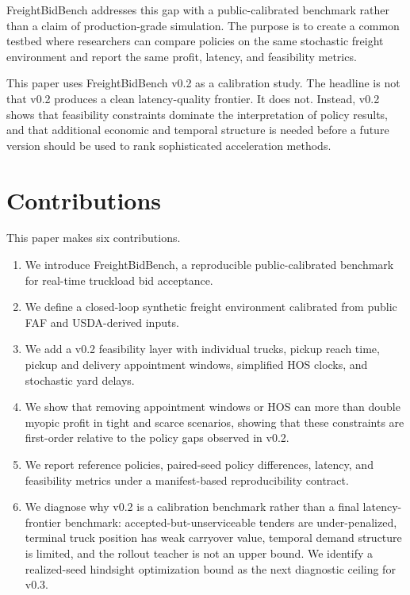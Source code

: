 \documentclass[11pt]{article}
\begin{document}
FreightBidBench addresses this gap with a public-calibrated benchmark rather
than a claim of production-grade simulation. The purpose is to create a common
testbed where researchers can compare policies on the same stochastic freight
environment and report the same profit, latency, and feasibility metrics.

This paper uses FreightBidBench v0.2 as a calibration study. The headline is
not that v0.2 produces a clean latency-quality frontier. It does not. Instead,
v0.2 shows that feasibility constraints dominate the interpretation of policy
results, and that additional economic and temporal structure is needed before a
future version should be used to rank sophisticated acceleration methods.

\section{Contributions}

This paper makes six contributions.

\begin{enumerate}
  \item We introduce FreightBidBench, a reproducible public-calibrated
  benchmark for real-time truckload bid acceptance.
  \item We define a closed-loop synthetic freight environment calibrated from
  public FAF and USDA-derived inputs.
  \item We add a v0.2 feasibility layer with individual trucks, pickup reach
  time, pickup and delivery appointment windows, simplified HOS clocks, and
  stochastic yard delays.
  \item We show that removing appointment windows or HOS can more than double
  myopic profit in tight and scarce scenarios, showing that these constraints
  are first-order relative to the policy gaps observed in v0.2.
  \item We report reference policies, paired-seed policy differences, latency,
  and feasibility metrics under a manifest-based reproducibility contract.
  \item We diagnose why v0.2 is a calibration benchmark rather than a final
  latency-frontier benchmark: accepted-but-unserviceable tenders are
  under-penalized, terminal truck position has weak carryover value, temporal
  demand structure is limited, and the rollout teacher is not an upper bound.
  We identify a realized-seed hindsight optimization bound as the next
  diagnostic ceiling for v0.3.
\end{enumerate}
\end{document}
